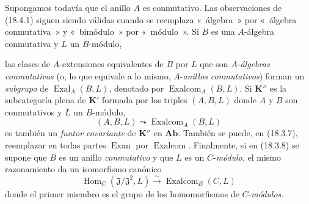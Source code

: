 \begin{env}[18.4.2]
\label{0.18.4.2-fr}
Supongamos todavía que el anillo $A$ es conmutativo. Las observaciones de (18.4.1) siguen
siendo válidas cuando se reemplaza «~álgebra~» por «~álgebra conmutativa~» y
«~bimódulo~» por «~módulo~». Si $B$ es una $A$-álgebra conmutativa y $L$ un
$B$-módulo,


las clases de $A$-extensiones equivalentes de $B$ por $L$ que son
$A$-\emph{álgebras conmutativas} (o, lo que equivale a lo mismo,
$A$-\emph{anillos conmutativos}) forman un \emph{subgrupo} de
$\operatorname{Exal}_A(B,L)$, denotado por $\operatorname{Exalcom}_A(B,L)$. Si
$\boldsymbol{K}''$ es la subcategoría plena de $\boldsymbol{K}'$ formada por los triples
$(A,B,L)$ donde $A$ y $B$ son conmutativos y $L$ un $B$-módulo,
\[
  (A,B,L)\leadsto\operatorname{Exalcom}_A(B,L)
\]
es también un \emph{funtor covariante} de $\boldsymbol{K}''$ en $\boldsymbol{Ab}$. También se
puede, en (18.3.7), reemplazar en todas partes $\operatorname{Exan}$ por
$\operatorname{Exalcom}$. Finalmente, si en (18.3.8) se supone que $B$ es un
anillo \emph{conmutativo} y que $L$ es un $C$-\emph{módulo}, el mismo
razonamiento da un isomorfismo canónico
\begin{equation}
\label{0.18.4.2.1-fr}
\tag{18.4.2.1}
  \operatorname{Hom}_C(\mathfrak J/\mathfrak J^2,L)
  \xrightarrow{\sim}\operatorname{Exalcom}_B(C,L)
\end{equation}
donde el primer miembro es el grupo de los homomorfismos de $C$-\emph{módulos}.
\end{env}

